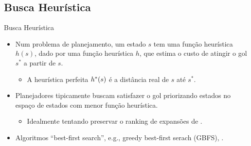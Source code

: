\documentclass{beamer}
\begin{document}
\subsection{Busca Heurística}
\begin{frame}{Busca Heurística}
\begin{itemize}
  \item Num problema de planejamento, um estado $s$ tem uma função heurística \alert{$h(s)$}, dado por uma função heurística $h$, que estima o \alert{custo de atingir o gol $s^{*}$} a partir de $s$.
  \begin{itemize}
    \item A heurística perfeita \alert{$h^{*}(s)$} é a \alert{distância real} de $s$ até $s^{*}$.
  \end{itemize}
  \pause
  \item Planejadores tipicamente buscam satisfazer o gol \alert{priorizando} estados no espaço de estados com \alert{menor função heurística}.
  \begin{itemize}
    \item Idealmente tentando preservar o ranking de expansões de \hstar.
  \end{itemize}
  \pause
  \item Algoritmos ``best-first search'', e.g., greedy best-first serach (GBFS), \astar.
\end{itemize}
\end{frame}
\end{document}
